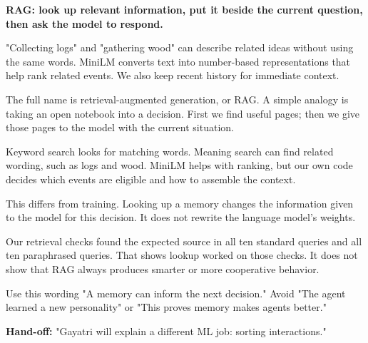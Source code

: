 \documentclass[11pt,a4paper]{article}
\newcommand{\pagehead}[3]{\clearpage{\color{forest}\small\ttfamily #1 \hfill #3}\par\vspace{3pt}{\LARGE\bfseries #2}\par\vspace{5pt}}
\newcommand{\subhead}[1]{\par\vspace{7pt}\noindent{\large\bfseries\color{forest}#1}\par\nobreak\vspace{2pt}}
\newcommand{\keyline}[1]{\begin{tcolorbox}[colback=ink,colframe=ink,arc=2mm,boxrule=0pt,left=4mm,right=4mm,top=3mm,bottom=3mm]\color{white}\bfseries #1\end{tcolorbox}}
\newcommand{\handoff}[1]{\vfill{\small\color{forest}\textbf{Hand-off:} #1}\par}
\begin{document}
\pagehead{RAG}{An open notebook before making a choice}{Ethan}
\label{rag}
\keyline{RAG: look up relevant information, put it beside the current question, then ask the model to respond.}
\begin{center}
\end{center}
\subhead{How meaning search helps}
"Collecting logs" and "gathering wood" can describe related ideas without using the same words. MiniLM converts text into number-based representations that help rank related events. We also keep recent history for immediate context.
\begin{saybox}
The full name is retrieval-augmented generation, or RAG. A simple analogy is taking an open notebook into a decision. First we find useful pages; then we give those pages to the model with the current situation.

Keyword search looks for matching words. Meaning search can find related wording, such as logs and wood. MiniLM helps with ranking, but our own code decides which events are eligible and how to assemble the context.

This differs from training. Looking up a memory changes the information given to the model for this decision. It does not rewrite the language model's weights.

Our retrieval checks found the expected source in all ten standard queries and all ten paraphrased queries. That shows lookup worked on those checks. It does not show that RAG always produces smarter or more cooperative behavior.
\end{saybox}
\begin{notebox}{Use this wording}
"A memory can inform the next decision." Avoid "The agent learned a new personality" or "This proves memory makes agents better."
\end{notebox}
\handoff{"Gayatri will explain a different ML job: sorting interactions."}
\end{document}
